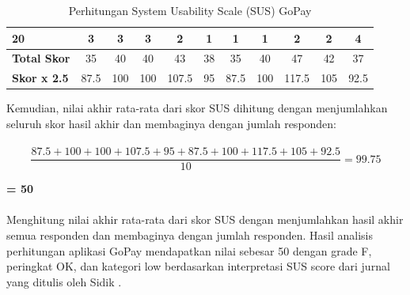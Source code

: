 \documentclass[
 manuscript=article,  %
  layout=publish, 
  year=2024, 
  month= Februari, %
  volume=8,
  number=1 
]{JIKO}
\begin{document}
\begin{table}[hbt!]
\begin{threeparttable}
\begin{tabular}{l*{10}{c}}
            \hline
            20 & 3 & 3 & 3 & 2 & 1 & 1 & 1 & 2 & 2 & 4 \\
            \midrule
            \textbf{Total Skor}   & 35 & 40 & 40 & 43 & 38 & 35 & 40 & 47 & 42 & 37 \\
            \hline
            \textbf{Skor x 2.5}   & 87.5 & 100 & 100 & 107.5 & 95 & 87.5 & 100 & 117.5 & 105 & 92.5 \\
            \bottomrule
        \end{tabular}
        \caption{Perhitungan System Usability Scale (SUS) GoPay}
        \label{tabel:sus_gopay}
    \end{threeparttable}
\end{table}

Kemudian, nilai akhir rata-rata dari skor SUS dihitung dengan menjumlahkan seluruh skor hasil akhir dan membaginya dengan jumlah responden: \\ \\ 
\[
\frac{87.5 + 100 + 100 + 107.5 + 95 + 87.5 + 100 + 117.5 + 105 + 92.5}{10} = 99.75
\]

\textbf{= 50} \\ \\ 
Menghitung nilai akhir rata-rata dari skor SUS dengan menjumlahkan hasil akhir semua responden dan membaginya dengan jumlah responden. Hasil analisis perhitungan aplikasi GoPay mendapatkan nilai sebesar 50 dengan grade F, peringkat OK, dan kategori low berdasarkan interpretasi SUS score dari jurnal yang ditulis oleh Sidik \cite{9}.
\end{document}

